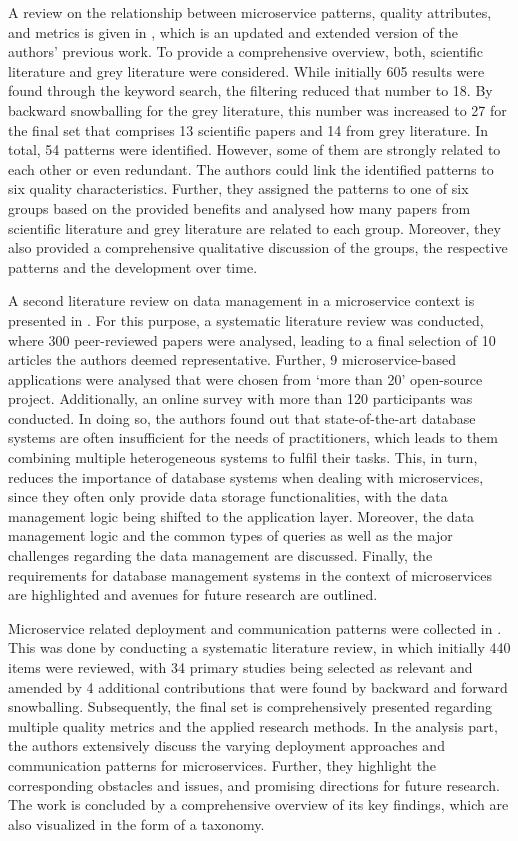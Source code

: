 \documentclass{bmcart}
\begin{document}
A review on the relationship between microservice patterns, quality attributes, and metrics is given in \cite{Valdivia.2020}, which is an updated and extended version of the authors' previous work. To provide a comprehensive overview, both, scientific literature and grey literature were considered. While initially 605 results were found through the keyword search, the filtering reduced that number to 18. By backward snowballing for the grey literature, this number was increased to 27 for the final set that comprises 13 scientific papers and 14 from grey literature. In total, 54 patterns were identified. However, some of them are strongly related to each other or even redundant. The authors could link the identified patterns to six quality characteristics. Further, they assigned the patterns to one of six groups based on the provided benefits and analysed how many papers from scientific literature and grey literature are related to each group. Moreover, they also provided a comprehensive qualitative discussion of the groups, the respective patterns and the development over time.

A second literature review on data management in a microservice context is presented in \cite{Laigner.2021}. For this purpose, a systematic literature review was conducted, where 300 peer-reviewed papers were analysed, leading to a final selection of 10 articles the authors deemed representative. Further, 9 microservice-based applications were analysed that were chosen from `more than 20' \cite{Laigner.2021} open-source project. Additionally, an online survey with more than 120 participants was conducted. In doing so, the authors found out that state-of-the-art database systems are often insufficient for the needs of practitioners, which leads to them combining multiple heterogeneous systems to fulfil their tasks. This, in turn, reduces the importance of database systems when dealing with microservices, since they often only provide data storage functionalities, with the data management logic being shifted to the application layer. Moreover, the data management logic and the common types of queries as well as the major challenges regarding the data management are discussed. Finally, the requirements for database management systems in the context of microservices are highlighted and avenues for future research are outlined.

Microservice related deployment and communication patterns were collected in \cite{aksakalli2021deployment}. This was done by conducting a systematic literature review, in which initially 440 items were reviewed, with 34 primary studies being selected as relevant and amended by 4 additional contributions that were found by backward and forward snowballing. Subsequently, the final set is comprehensively presented regarding multiple quality metrics and the applied research methods. In the analysis part, the authors extensively discuss the varying deployment approaches and communication patterns for microservices. Further, they highlight the corresponding obstacles and issues, and promising directions for future research. The work is concluded by a comprehensive overview of its key findings, which are also visualized in the form of a taxonomy. 
\end{document}
